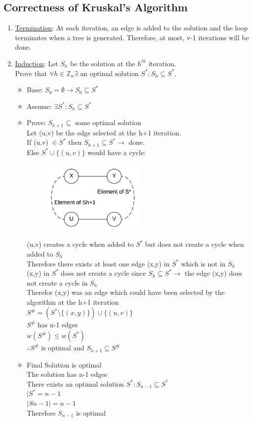 \documentclass[12pt,letterpaper]{article}
\begin{document}
\subsection{Correctness of Kruskal's Algorithm}
\begin{enumerate}
\item \underline{Termination}: At each iteration, an edge is added to the solution and the loop terminates when a tree is generated. Therefore, at most, v-1 iterations will be done.
\item \underline{Induction}: Let $S_h$ be the solution at the $h^{th}$ iteration. \\ Prove that $\forall h \in \mathbb{Z}_n \exists \text{ an optimal solution }S^*:S_h\subseteq S^*$. 
\begin{itemize}
\item Base: $S_0= \emptyset \to S_0 \subseteq S^*$
\item Assume: $\exists S^*:S_h\subseteq S^*$
\item Prove: $S_{h+1}\subseteq \text{ some optimal solution }$\\Let (u,v) be the edge selected at the h+1 iteration. \\ 
If (u,v) $\in S^*$ then $S_{h+1}\subseteq S^*\to$ done. \\
Else $S^*\cup \{(u,v)\}$ would have a cycle:
\begin{figure}[h]
\centering
\includegraphics[width=5cm]{kruprex}
\end{figure} 
(u,v) creates a cycle when added to $S^*$ but does not create a cycle when added to $S_h$\\
Therefore there exists at least one edge (x,y) in $S^*$ which is not in $S_h$ \\
(x,y) in $S^*$ does not create a cycle since $S_h\subseteq S^* \to $ the edge (x,y) does not create a cycle in $S_h$\\
Therefor (x,y) was an edge which could have been selected by the algorithm at the h+1 iteration\\
$S^\#=(S^*\setminus \{(x,y)\})\cup \{(u,v)\}$\\
$S^\#$ has n-1 edges \\
$w(S^\#)\leq w(S^*)$\\
$\therefore S^\#$ is optimal and $S_{h+1}\subseteq S^\#$
\item Final Solution is optimal\\
The solution has n-1 edges\\
There exists an optimal solution $S^*:S_{n-1}\subseteq S^*$\\
$|S^*=n-1$\\
$|S{n-1}|=n-1$\\
Therefore $S_{n-1}$ is optimal
\end{itemize}
\end{enumerate}
\end{document}
